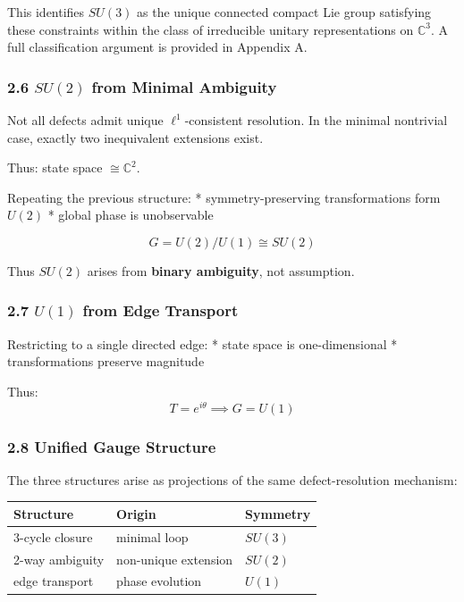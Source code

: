 \documentclass[
]{article}
\begin{document}
This identifies \(SU(3)\) as the unique connected compact Lie group
satisfying these constraints within the class of irreducible unitary
representations on \(\mathbb{C}^3\). A full classification argument is
provided in Appendix A.

\hypertarget{su2-from-minimal-ambiguity}{%
\subsubsection{\texorpdfstring{2.6 \(SU(2)\) from Minimal
Ambiguity}{2.6 SU(2) from Minimal Ambiguity}}\label{su2-from-minimal-ambiguity}}

Not all defects admit unique \(\ell^1\)-consistent resolution. In the
minimal nontrivial case, exactly two inequivalent extensions exist.

Thus: state space \(\cong \mathbb{C}^2\).

Repeating the previous structure: * symmetry-preserving transformations
form \(U(2)\) * global phase is unobservable

\[G = U(2)/U(1) \cong SU(2)\]

Thus \(SU(2)\) arises from \textbf{binary ambiguity}, not assumption.

\hypertarget{u1-from-edge-transport}{%
\subsubsection{\texorpdfstring{2.7 \(U(1)\) from Edge
Transport}{2.7 U(1) from Edge Transport}}\label{u1-from-edge-transport}}

Restricting to a single directed edge: * state space is one-dimensional
* transformations preserve magnitude

Thus: \[T = e^{i\theta} \implies G = U(1)\]

\hypertarget{unified-gauge-structure}{%
\subsubsection{2.8 Unified Gauge
Structure}\label{unified-gauge-structure}}

The three structures arise as projections of the same defect-resolution
mechanism:

\begin{longtable}[]{@{}lll@{}}
\toprule
Structure & Origin & Symmetry\tabularnewline
\midrule
\endhead
3-cycle closure & minimal loop & \(SU(3)\)\tabularnewline
2-way ambiguity & non-unique extension & \(SU(2)\)\tabularnewline
edge transport & phase evolution & \(U(1)\)\tabularnewline
\bottomrule
\end{longtable}
\end{document}
